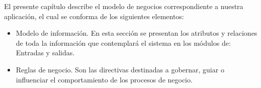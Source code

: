 
El presente capítulo describe el modelo de negocios correspondiente a nuestra aplicación, el cual se conforma de los siguientes elementos:

\begin{itemize}
    \item Modelo de información. En esta sección se presentan los atributos y relaciones de toda la información que contemplará el sistema en los módulos de: Entradas y salidas.

    \item Reglas de negocio. Son las directivas destinadas a gobernar, guiar o influenciar el comportamiento de los procesos de negocio.
\end{itemize}

